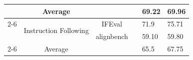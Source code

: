 \begin{table}[h]
\begin{tabular}{ccccll}
                                     & {Average}                                                                                &                     &  & 69.22 & 69.96 \\ \cmidrule{2-6} 
                                     & \multirow{2}{*}{{Instruction Following}}                                                 & IFEval              &  & 71.9  & 75.71 \\ 
                                     &                                                                                                 & alignbench          &  & 59.10  & 59.80  \\ \cmidrule{2-6} 
                                     & {Average}                                                                                &                     &  & 65.5  & 67.75 \\ 
\bottomrule
\end{tabular}
\end{table}



